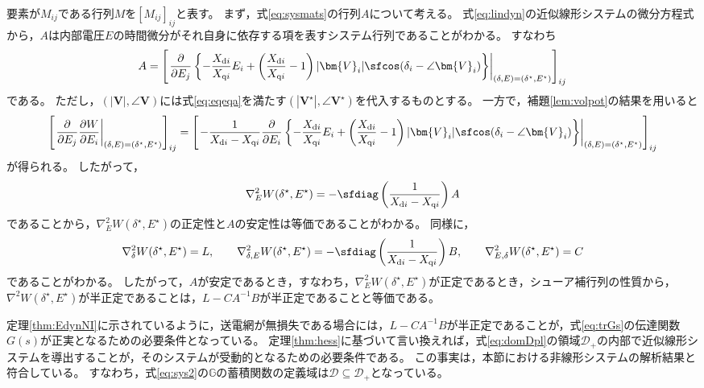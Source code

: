 \documentclass[tombow,dvipdfmx]{corona-a5}
\begin{document}
\begin{証明}
要素が$M_{ij}$である行列$M$を$[M_{ij}]_{ij}$と表す。
まず，式\ref{eq:sysmats}の行列$A$について考える。
式\ref{eq:lindyn}の近似線形システムの微分方程式から，$A$は内部電圧$E$の時間微分がそれ自身に依存する項を表すシステム行列であることがわかる。
すなわち
\begin{align*}
A = \left[
\left.
\frac{\partial}{\partial E_j}
\left\{
-\frac{X_{{\rm d}i}}{X_{{\rm q}i}}E_i
+\left(
\frac{X_{{\rm d}i}}{X_{{\rm q}i}}-1
\right)
|\bm{V}_i| \sfcos (\delta_i - \angle \bm{V}_i ) 
\right\}
\right|_{(\delta,E)=(\delta^{\star},E^{\star})}
\right]_{ij}
\end{align*}
である。
ただし，$(|\bm{V}|,\angle \bm{V})$には式\ref{eq:eqeqa}を満たす$(|\bm{V}^{\star}|,\angle \bm{V}^{\star})$を代入するものとする。
一方で，補題\ref{lem:volpot}の結果を用いると
\begin{align*}
\left[
\left.
\frac{\partial}{\partial E_j}
\frac{\partial W}{\partial E_i}
\right|_{(\delta,E)=(\delta^{\star},E^{\star})}
\right]_{ij}
=
\left[
\left.
-\frac{1}{X_{{\rm d}i} - X_{{\rm q}i}}
\frac{\partial}{\partial E_i}
\left\{
-\frac{X_{{\rm d}i}}{X_{{\rm q}i}}E_i
+\left(
\frac{X_{{\rm d}i}}{X_{{\rm q}i}}-1
\right)
|\bm{V}_i| \sfcos (\delta_i - \angle \bm{V}_i ) 
\right\}
\right|_{(\delta,E)=(\delta^{\star},E^{\star})}
\right]_{ij}
\end{align*}
が得られる。
したがって，
\begin{align*}
\nabla^2_{E} W(\delta^{\star}, E^{\star})
= 
-\sfdiag\left(
\frac{1}{X_{{\rm d}i} - X_{{\rm q}i}}
\right)
A
\end{align*}
であることから，$\nabla^2_{E} W(\delta^{\star}, E^{\star})$の正定性と$A$の安定性は等価であることがわかる。
同様に，
\begin{align*}
\nabla^2_{\delta} W(\delta^{\star}, E^{\star})
=L
,\qquad
\nabla^2_{\delta,E} W(\delta^{\star}, E^{\star})
=
-\sfdiag\left(
\frac{1}{X_{{\rm d}i} - X_{{\rm q}i}}
\right)
B
,\qquad
\nabla^2_{E,\delta} W(\delta^{\star}, E^{\star})
=
C
\end{align*}
であることがわかる。
したがって，$A$が安定であるとき，すなわち，$\nabla^2_{E} W(\delta^{\star}, E^{\star})$が正定であるとき，シューア補行列の性質から，$\nabla^2 W(\delta^{\star}, E^{\star})$が半正定であることは，$L-CA^{-1}B$が半正定であることと等価である。
\end{証明}

定理\ref{thm:EdynNI}に示されているように，送電網が無損失である場合には，$L-CA^{-1}B$が半正定であることが，式\ref{eq:trGs}の伝達関数$G(s)$が正実となるための必要条件となっている。
定理\ref{thm:hess}に基づいて言い換えれば，式\ref{eq:domDpl}の領域$\mathcal{D}_{+}$の内部で近似線形システムを導出することが，そのシステムが受動的となるための必要条件である。
この事実は，本節における非線形システムの解析結果と符合している。
すなわち，式\ref{eq:sys2}の$\mathds{G}$の蓄積関数の定義域は$\mathcal{D}\subseteq \mathcal{D}_{+}$となっている。
\end{document}
